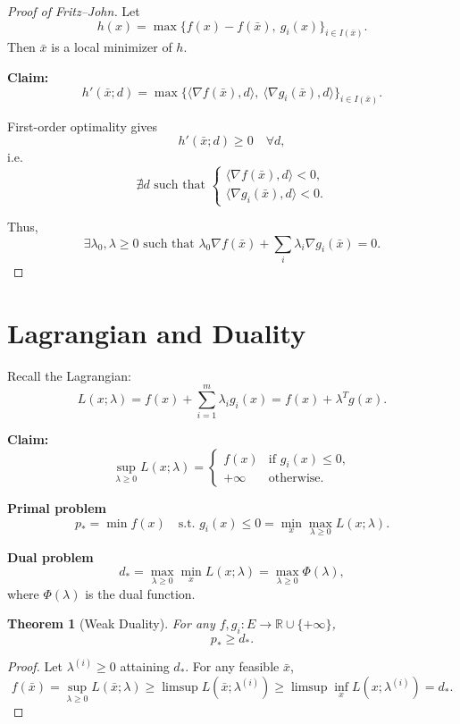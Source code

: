 \documentclass[12pt,oneside]{book}
\numberwithin{equation}{section}
\theoremstyle{definition}
\theoremstyle{plain}
\newtheorem{theorem}{Theorem}[section]
\theoremstyle{remark}
\begin{document}
\begin{proof}[Proof of Fritz--John]
Let
\[
h(x) = \max\{ f(x) - f(\bar{x}),\ g_i(x)\}_{i\in I(\bar{x})}.
\]
Then $\bar{x}$ is a local minimizer of $h$.

\textbf{Claim:}
\[
h'(\bar{x};d) = \max\{ \langle \nabla f(\bar{x}), d \rangle,\ \langle \nabla g_i(\bar{x}), d \rangle \}_{i\in I(\bar{x})}.
\]

First-order optimality gives
\[
h'(\bar{x};d) \ge 0 \quad \forall d,
\]
i.e.
\[
\nexists d \text{ such that } 
\begin{cases}
\langle \nabla f(\bar{x}), d \rangle < 0,\\
\langle \nabla g_i(\bar{x}), d \rangle < 0.
\end{cases}
\]

Thus,
\[
\exists \lambda_0,\lambda \ge 0 \text{ such that }
\lambda_0 \nabla f(\bar{x}) + \sum_i \lambda_i \nabla g_i(\bar{x}) = 0.
\]
\end{proof}

\section{Lagrangian and Duality}

Recall the Lagrangian:
\[
L(x;\lambda) = f(x) + \sum_{i=1}^m \lambda_i g_i(x)
= f(x) + \lambda^T g(x).
\]

\textbf{Claim:}
\[
\sup_{\lambda \ge 0} L(x;\lambda)
=
\begin{cases}
f(x) & \text{if } g_i(x) \le 0,\\
+\infty & \text{otherwise}.
\end{cases}
\]

\textbf{Primal problem}
\[
p_* =
\min f(x)
\quad \text{s.t. } g_i(x) \le 0
=
\min_x \max_{\lambda \ge 0} L(x;\lambda).
\]

\textbf{Dual problem}
\[
d_* = \max_{\lambda \ge 0} \min_x L(x;\lambda)
= \max_{\lambda \ge 0} \Phi(\lambda),
\]
where $\Phi(\lambda)$ is the dual function.

\begin{theorem}[Weak Duality]
For any $f,g_i: E \to \mathbb{R}\cup\{+\infty\}$,
\[
p_* \ge d_*.
\]
\end{theorem}

\begin{proof}
Let $\lambda^{(i)} \ge 0$ attaining $d_*$. For any feasible $\bar{x}$,
\[
f(\bar{x}) = \sup_{\lambda \ge 0} L(\bar{x};\lambda)
\ge \limsup L(\bar{x};\lambda^{(i)})
\ge \limsup \inf_x L(x;\lambda^{(i)})
= d_*.
\]
\end{proof}
\end{document}
